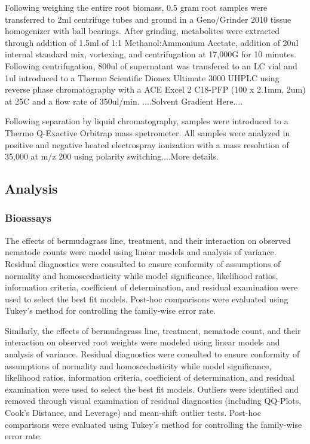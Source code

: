 \documentclass[9pt,lineno]{elife}
\begin{document}
Following weighing the entire root biomass, 0.5 gram root samples were transferred to 2ml centrifuge tubes and ground in a Geno/Grinder 2010 tissue homogenizer with ball bearings.  After grinding, metabolites were extracted through addition of 1.5ml of 1:1 Methanol:Ammonium Acetate, addition of 20ul internal standard mix, vortexing, and centrifugation at 17,000G for 10 minutes.  Following centrifugation, 800ul of supernatant was transfered to an LC vial and 1ul introduced to a Thermo Scientific Dionex Ultimate 3000 UHPLC using reverse phase chromatography with a ACE Excel 2 C18-PFP (100 x 2.1mm, 2um) at 25C and a flow rate of 350ul/min.  ....Solvent Gradient Here.... 

Following separation by liquid chromatography, samples were introduced to a Thermo Q-Exactive Orbitrap mass spetrometer.  All samples were analyzed in positive and negative heated electrospray ionization with a mass resolution of 35,000 at m/z 200 using polarity switching....More details.  


\subsection{Analysis}

\subsubsection{Bioassays}

The effects of bermudagrass line, treatment, and their interaction on observed nematode counts were model using linear models and analysis of variance.  Residual diagnostics were consulted to ensure conformity of assumptions of normality and homoscedasticity while model significance, likelihood ratios, information criteria, coefficient of determination, and residual examination were used to select the best fit models.  Post-hoc comparisons were evaluated using Tukey's method for controlling the family-wise error rate. 

Similarly, the effects of bermudagrass line, treatment, nematode count, and their interaction on observed root weights were modeled using linear models and analysis of variance. Residual diagnostics were consulted to ensure conformity of assumptions of normality and homoscedasticity while model significance, likelihood ratios, information criteria, coefficient of determination, and residual examination were used to select the best fit models.  Outliers were identified and removed through visual examination of residual diagnostics (including QQ-Plots, Cook's Distance, and Leverage) and mean-shift outlier tests.  Post-hoc comparisons were evaluated using Tukey's method for controlling the family-wise error rate.
\end{document}
